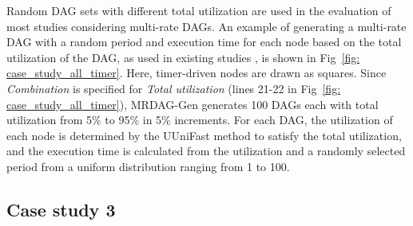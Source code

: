 Random DAG sets with different total utilization are used in the evaluation of most studies considering multi-rate DAGs.
An example of generating a multi-rate DAG with a random period and execution time for each node based on the total utilization of the DAG, as used in existing studies \cite{he2021response, gunzel2021suspension, ueter2021hard}, is shown in Fig~\ref{fig: case_study_all_timer}.
Here, timer-driven nodes are drawn as squares.
Since {\it Combination} is specified for {\it Total utilization} (lines 21-22 in Fig~\ref{fig: case_study_all_timer}), MRDAG-Gen generates 100 DAGs each with total utilization from 5\% to 95\% in 5\% increments.
For each DAG, the utilization of each node is determined by the UUniFast method to satisfy the total utilization, and the execution time is calculated from the utilization and a randomly selected period from a uniform distribution ranging from 1 to 100.


\subsection{Case study 3}
\label{ssec: case_study_3}


